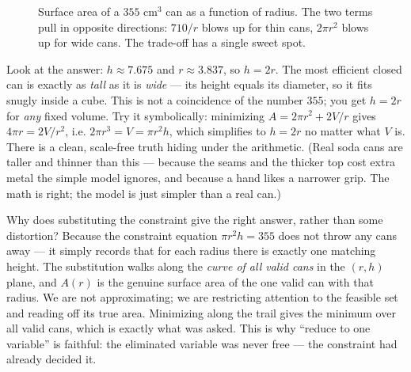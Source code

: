 \begin{figure}[H]
\centering
{}
\caption{Surface area of a $355$ cm$^3$ can as a function of radius. The two terms
pull in opposite directions: $710/r$ blows up for thin cans, $2\pi r^2$ blows up for
wide cans. The trade-off has a single sweet spot.}
\label{ch17:fig-can}
\end{figure}

\begin{aestheticbox}
Look at the answer: $h \approx 7.675$ and $r \approx 3.837$, so
$h = 2r$. The most efficient closed can is exactly as \emph{tall} as it is
\emph{wide} --- its height equals its diameter, so it fits snugly inside a cube. This
is not a coincidence of the number $355$; you get $h=2r$ for \emph{any} fixed volume.
Try it symbolically: minimizing $A=2\pi r^2 + 2V/r$ gives $4\pi r = 2V/r^2$, i.e.
$2\pi r^3 = V = \pi r^2 h$, which simplifies to $h=2r$ no matter what $V$ is. There is
a clean, scale-free truth hiding under the arithmetic. (Real soda cans are taller and
thinner than this --- because the seams and the thicker top cost extra metal the
simple model ignores, and because a hand likes a narrower grip. The math is right; the
model is just simpler than a real can.)
\end{aestheticbox}

\begin{whybox}
Why does substituting the constraint give the right answer, rather than some
distortion? Because the constraint equation $\pi r^2 h = 355$ does not throw any cans
away --- it simply records that for each radius there is exactly one matching height.
The substitution walks along the \emph{curve of all valid cans} in the $(r,h)$ plane,
and $A(r)$ is the genuine surface area of the one valid can with that radius. We are
not approximating; we are restricting attention to the feasible set and reading off
its true area. Minimizing along the trail gives the minimum over all valid cans,
which is exactly what was asked. This is why ``reduce to one variable'' is faithful:
the eliminated variable was never free --- the constraint had already decided it.
\end{whybox}

